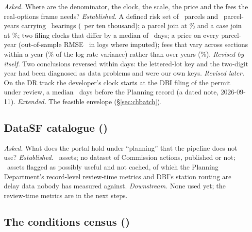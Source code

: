 \documentclass[11pt]{article}
\begin{document}
\textit{Asked.} Where are the denominator, the clock, the scale, the price and the fees the
real-options frame needs? \textit{Established.} A defined risk set of \acqRiskParcels\ parcels and
\acqRiskParcelYears\ parcel-years carrying \acqRiskEvents\ hearings (\acqRiskRate\ per ten
thousand); a parcel join at \acqParcelJoin\% and a case join at \acqCaseAny\%; two filing clocks
that differ by a median of \acqClockGapMed\ days; a price on every parcel-year (out-of-sample
RMSE \acqPriceRmse\ in logs where imputed); fees that vary across sections within a year
(\acqFeeWithin\% of the log-rate variance) rather than over years (\acqFeeAbsYear\%).
\textit{Revised by itself.} Two conclusions reversed within days: the lettered-lot key and the
two-digit year had been diagnosed as data problems and were our own keys. \textit{Revised later.}
On the DR track the developer's clock starts at the DBI filing of the permit under review, a
median \pcDrDiffMed\ days before the Planning record (a dated note, 2026-09-11). \textit{Extended.}
The feasible envelope (\S\ref{sec:chbatch}).

\subsection{DataSF catalogue (\chDateDatasfPlanningCatalogue)}\label{sec:chdatasfplanningcatalogue}

\textit{Asked.} What does the portal hold under ``planning'' that the pipeline does not use?
\textit{Established.} \catTotal\ assets; no dataset of Commission actions, published or not;
\catPossibleNotCached\ assets flagged as possibly useful and not cached, of which the
Planning Department's record-level review-time metrics and DBI's station routing are delay data
nobody has measured against. \textit{Downstream.} None used yet; the review-time metrics are in the next steps.

\subsection{The conditions census (\chDateConditionsContent)}\label{sec:chconditionscontent}
\end{document}
